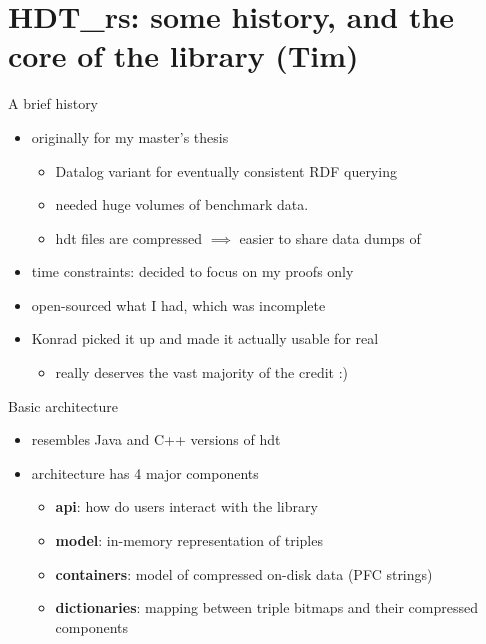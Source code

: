 \documentclass[14pt,aspectratio=169]{beamer}
\begin{document}
\section{HDT\_rs: some history, and the core of the library (Tim)}

\begin{frame}{A brief history}
    \begin{itemize}
        \item originally for my master's thesis
            \begin{itemize}
                \item Datalog variant for eventually consistent RDF querying
                \item needed huge volumes of benchmark data.
                \item hdt files are compressed $\implies$ easier to share data dumps of
            \end{itemize}
        \item time constraints: decided to focus on my proofs only
        \item open-sourced what I had, which was incomplete
        \item Konrad picked it up and made it actually usable for real
            \begin{itemize}
                \item really deserves the vast majority of the credit :)
            \end{itemize}
    \end{itemize}
\end{frame}

\begin{frame}{Basic architecture}
    \begin{itemize}
        \item resembles Java and C++ versions of hdt
        \item architecture has 4 major components
            \begin{itemize}
                \item \textbf{api}: how do users interact with the library
                \item \textbf{model}: in-memory representation of triples
                \item \textbf{containers}: model of compressed on-disk data (PFC strings)
                \item \textbf{dictionaries}: mapping between triple bitmaps and their compressed
                    components
            \end{itemize}
    \end{itemize}
\end{frame}
\end{document}
